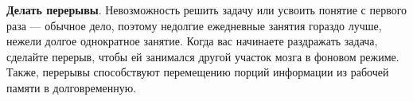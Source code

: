 \documentclass{article}
\begin{document}
\textbf{Делать перерывы}. Невозможность решить задачу или усвоить понятие с первого раза --- обычное дело, поэтому недолгие ежедневные занятия гораздо лучше, нежели долгое однократное занятие. Когда вас начинаете раздражать задача, сделайте перерыв, чтобы ей занимался другой участок мозга в фоновом режиме. Также, перерывы способствуют перемещению порций информации из рабочей памяти в долговременную.
\smallskip
\end{document}
